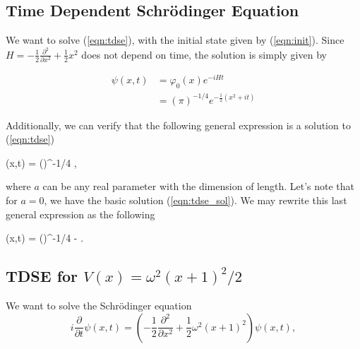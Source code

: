 \subsection{Time Dependent Schr\"odinger Equation}

We want to solve (\ref{eqn:tdse}), 
with the initial state given by (\ref{eqn:init}). 
Since 
${H}= -\frac{1}{2}\frac{\partial^2}{\partial x^2} + \frac{1}{2}x^2$ 
does not depend on time, the solution is simply given by

\begin{align}
	\psi(x,t) &  = \varphi_0(x)e^{-iHt}  \\
	 & = \left(\pi\right)^{-1/4} e^{-\frac{1}{2}(x^2+it)}  
                   \label{eqn:tdse_sol}
\end{align}

\noindent Additionally, we can verify that the following general expression
is a solution to (\ref{eqn:tdse})
\begin{\eq}
	\psi(x,t) = \left(\pi\right)^{-1/4} 
           \exp {},
                   \label{eqn:tdse_gensol_1}
\end{\eq}

\noindent where $a$ can be any real parameter with the dimension of length.
Let's note that for $a=0$, we have the basic solution (\ref{eqn:tdse_sol}).
We may rewrite this last general expression as the following

\begin{\eq}
	\psi(x,t) = \left(\pi\right)^{-1/4}
         \exp\left\lbrace -
\right\rbrace.
                  \label{eqn:tdse_gensol_2}
\end{\eq}

\newpage

\subsection{TDSE for $V(x)=\omega^2(x+1)^2/2$}

We want to solve the Schr\"odinger equation 
\begin{equation}
 i\frac{\partial}{\partial t}\psi(x,t) = 
	\left(-\frac{1}{2}\frac{\partial^2}{\partial x^2} 
          + \frac{1}{2}\omega^2(x+1)^2\right)\psi(x,t),
    \label{eqn:tdse_2}
\end{equation}

